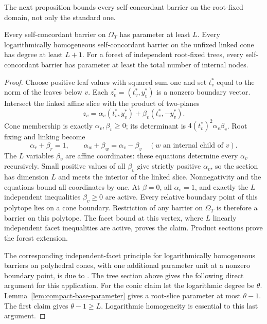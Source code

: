 The next proposition bounds every self-concordant barrier on the
root-fixed domain, not only the standard one.

\begin{proposition}\label{prop:tree-intrinsic}
Every self-concordant barrier on $\Omega_T$ has parameter at least $L$.
Every logarithmically homogeneous self-concordant barrier on the
unfixed linked cone has degree at least $L+1$.  For a forest of
independent root-fixed trees, every self-concordant barrier has
parameter at least the total number of internal nodes.
\end{proposition}
\begin{proof}
Choose positive leaf values with squared sum one and set $t_v^*$
equal to the norm of the leaves below $v$.  Each
$z_v^*=(t_v^*,y_v^*)$ is a nonzero boundary vector.  Intersect the
linked affine slice with the product of two-planes
\[
 z_v=\alpha_v(t_v^*,y_v^*)+\beta_v(t_v^*,-y_v^*).
\]
Cone membership is exactly $\alpha_v,\beta_v\geq0$; its determinant
is $4(t_v^*)^2\alpha_v\beta_v$.  Root fixing and linking become
\begin{equation}\label{eq:tree-polysection}
 \alpha_r+\beta_r=1,\qquad
 \alpha_w+\beta_w=\alpha_v-\beta_v
 \quad(w\text{ an internal child of }v).
\end{equation}
The $L$ variables $\beta_v$ are affine coordinates: these equations
determine every $\alpha_v$ recursively.  Small positive values of
all $\beta_v$ give strictly positive $\alpha_v$, so the section has
dimension $L$ and meets the interior of the linked slice.
Nonnegativity and the equations bound all coordinates by one.
At $\beta=0$, all $\alpha_v=1$, and exactly the $L$ independent
inequalities $\beta_v\geq0$ are active.  Every relative boundary
point of this polytope lies on a cone boundary.  Restriction of any
barrier on $\Omega_T$ is therefore a barrier on this polytope.
The facet bound \cite[Proposition~2.3.6]{NN1994} at this vertex, where
$L$ linearly independent facet inequalities are active, proves the
claim.  Product sections
prove the forest extension.

The corresponding independent-facet principle for logarithmically
homogeneous barriers on polyhedral cones, with one additional parameter
unit at a nonzero boundary point, is due to
\citet[Theorem~6.1]{Hildebrand2013}. The tree section above gives the
following direct argument for this application.
For the conic claim let the logarithmic degree be $\theta$.
Lemma~\ref{lem:compact-base-parameter} gives a root-slice parameter
at most $\theta-1$.  The first claim gives $\theta-1\geq L$.
Logarithmic homogeneity is essential to this last argument.
\end{proof}

